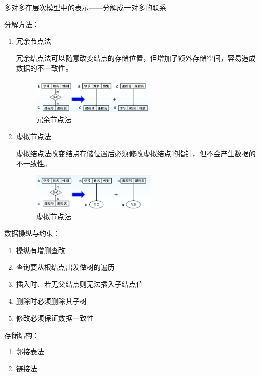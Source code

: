 \documentclass{article}
\begin{document}
\begin{enumerate}
    多对多在层次模型中的表示——分解成一对多的联系

    分解方法：
    \begin{enumerate}
        \item 冗余节点法
        
        冗余结点法可以随意改变结点的存储位置，但增加了额外存储空间，容易造成数据的不一致性。

        \begin{figure}[H]
    
            \centering
            \includegraphics*[width = 6cm]{img/1.2-8.png}
            \caption{冗余节点法}
        \end{figure}
        \item 虚拟节点法
        
        虚拟结点法改变结点存储位置后必须修改虚拟结点的指针，但不会产生数据的不一致性。

        \begin{figure}[H]
    
            \centering
            \includegraphics*[width = 6cm]{img/1.2-9.png}
            \caption{虚拟节点法}
        \end{figure}

    \end{enumerate}

    数据操纵与约束：

    \begin{enumerate}
        \item 操纵有增删查改
        \item 查询要从根结点出发做树的遍历
        \item 插入时、若无父结点则无法插入子结点值
        \item 删除时必须删除其子树
        \item 修改必须保证数据一致性
    \end{enumerate}

    存储结构：
    \begin{enumerate}
        \item 邻接表法
        \item 链接法
    \end{enumerate}


\end{enumerate}
\end{document}
